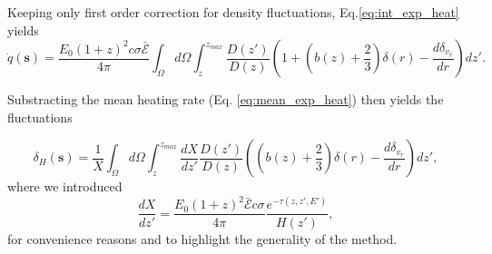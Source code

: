 \documentclass[twocolumns]{emulateapj}
\begin{document}
{%









Keeping only first order correction for density fluctuations, Eq.\ref{eq:int_exp_heat} yields
\begin{equation}
  \label{eq:mean_heat0}
  \dot{q}(\mathbf{s})=\frac{E_0(1+z)^2c\sigma\mathcal{\bar{E}}}{4\pi}\int_{\Omega}d\Omega\int_z^{z_{max}}\frac{D(z')}{D(z)}\left(1+\left(b(z)+\frac{2}{3}\right) \delta(r) -\frac{d\delta_{v_r}}{dr}\right) dz'.
\end{equation}

Substracting the mean heating rate (Eq. \ref{eq:mean_exp_heat}) then yields the fluctuations

\begin{equation}
  \label{eq:heat_fluc0}
  \delta_H(\mathbf{s})=\frac{1}{X}\int_{\Omega}d\Omega\int_z^{z_{max}}\frac{dX}{dz'}\frac{D(z')}{D(z)}\left(\left(b(z)+\frac{2}{3}\right) \delta(r) -\frac{d\delta_{v_r}}{dr}\right)   dz',
\end{equation}
where we introduced
\begin{equation}
  \label{eq:def_X}
  \frac{dX}{dz'}=\frac{E_0(1+z)^2\mathcal{\bar{E}}c\sigma}{4\pi}\frac{e^{-\tau(z,z',E')}}{H(z')},
\end{equation}
for convenience reasons and to highlight the generality of the method.


}
\end{document}
